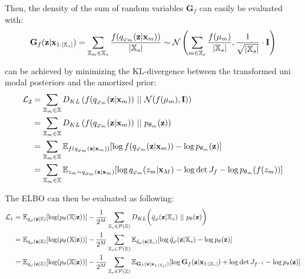Then, the density of the sum of random variables $\textbf{G}_f$ can easily be evaluated with:
\begin{equation}
    \textbf{G}_f(\textbf{z}|\textbf{x}_{1:|\mathbb{X}_s|}) =\sum _{\mathbb{X}_m \in \mathbb{X}_s} \frac{f(q_{\varphi_m}(\textbf{z}|\textbf{x}_m))}{|\mathbb{X}_s|} \sim \mathcal{N} \left(  \sum _{m \in \mathbb{X}_s} \frac{f(\mu_m)}{|\mathbb{X}_s|}, \frac{1}{\sqrt{|\mathbb{X}_s|}}  \cdot \textbf{I} \right)
\end{equation}

 can be achieved by minimizing the KL-divergence between the transformed uni modal posteriors and the amortized prior:
\begin{equation}
    \begin{split}
        \mathcal{L}_2 &= \sum _{\xsetm \in \xset} D_{KL}\left( f(\unimodalpost)\ ||\ \mathcal{N}(f(\mu_m), \textbf{I}) \right)\\
        &= \sum _{\xsetm \in \xset} D_{KL}\left( f(\unimodalpost)\ ||\ p_{\theta_m}(\textbf{z}) \right)\\
        &=  \sum _{\xsetm \in \xset} \mathbb{E}_{f(\unimodalpost)} [\log f(\unimodalpost) - \log p_{\theta_m}(\textbf{z})]\\
        &=  \sum _{\xsetm \in \xset} \mathbb{E}_{z_m \sim \unimodalpost} [\log q_{\phi_m}(z_m|\textbf{x}_M) - \log \det J_f  - \log p_{\theta_m}(f(z_m))]\\
    \end{split}
\end{equation}

The ELBO can then be evaluated as following:
\begin{equation}
    \begin{split}
        \mathcal{L}_1 &=  \mathbb{E}_{q_{\phi}(\textbf{z}|\mathbb{X})}[\log (p_{\theta}(\mathbb{X}|\textbf{z}))] -  \frac{1}{2^M} \sum _{\mathbb{X}_s \in \mathcal{P}(\mathbb{X})} D_{KL}\biggl( \tilde{q}_{\phi}(\textbf{z}|\mathbb{X}_s)\ ||\ p_{\theta}(\textbf{z})\biggr)\\
        &= \mathbb{E}_{q_{\phi}(\textbf{z}|\mathbb{X})}[\log (p_{\theta}(\mathbb{X}|\textbf{z}))] - \frac{1}{2^M} \sum _{\mathbb{X}_s \in \mathcal{P}(\mathbb{X})} \mathbb{E}_{\tilde{q}_{\phi}(\textbf{z}|\mathbb{X}_s)}[\log \tilde{q}_{\phi}(\textbf{z}|\mathbb{X}_s) - \log p_{\theta}(\textbf{z}) ]\\
        &= \mathbb{E}_{q_{\phi}(\textbf{z}|\mathbb{X})}[\log (p_{\theta}(\mathbb{X}|\textbf{z}))] - \frac{1}{2^M} \sum _{\mathbb{X}_s \in \mathcal{P}(\mathbb{X})} \mathbb{E}_{\textbf{G}_f(\textbf{z}|\textbf{x}_{1:|\xsubset|})}[\log \textbf{G}_f(\textbf{z}|\textbf{x}_{1:|\xsubset|}) + \log \det J_{f^{-1}}- \log p_{\theta}(\textbf{z}) ]
    \end{split}
\end{equation}

